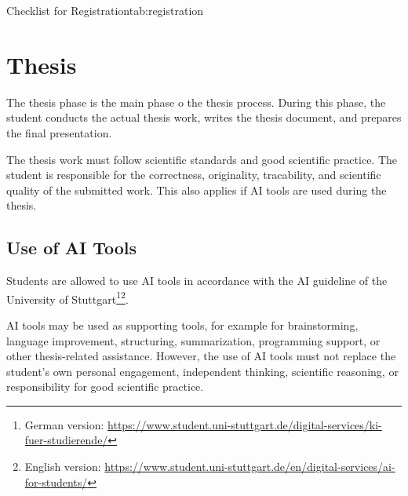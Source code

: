 \documentclass[11pt,a4paper]{article}
\begin{document}
\begin{checklisttable}{Checklist for Registration}{tab:registration}

\addlinespace[0.5em]


\addlinespace[0.5em]


\end{checklisttable}

\section{Thesis}
The thesis phase is the main phase o the thesis process.
During this phase, the student conducts the actual thesis work, writes the thesis document, and prepares the final presentation.

The thesis work must follow scientific standards and good scientific practice.
The student is responsible for the correctness, originality, tracability, and scientific quality of the submitted work.
This also applies if AI tools are used during the thesis.

\subsection{Use of AI Tools}
Students are allowed to use AI tools in accordance with the AI guideline of the University of Stuttgart\footnote{German version: \url{https://www.student.uni-stuttgart.de/digital-services/ki-fuer-studierende/}}\footnote{English version: \url{https://www.student.uni-stuttgart.de/en/digital-services/ai-for-students/}}.

AI tools may be used as supporting tools, for example for brainstorming, language improvement, structuring, summarization, programming support, or other thesis-related assistance.
However, the use of AI tools must not replace the student's own personal engagement, independent thinking, scientific reasoning, or responsibility for good scientific practice.
\end{document}

